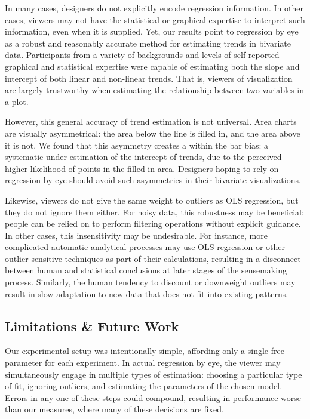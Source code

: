\documentclass{sigchi}
\begin{document}
In many cases, designers do not explicitly encode regression information. In other cases, viewers may not have the statistical or graphical expertise to interpret such information, even when it is supplied. Yet, our results point to regression by eye as a robust and reasonably accurate method for estimating trends in bivariate data. Participants from a variety of backgrounds and levels of self-reported graphical and statistical expertise were capable of estimating both the slope and intercept of both linear and non-linear trends. That is, viewers of visualization are largely trustworthy when estimating the relationship between two variables in a plot.

However, this general accuracy of trend estimation is not universal. Area charts are visually asymmetrical: the area below the line is filled in, and the area above it is not. We found that this asymmetry creates a within the bar bias: a systematic under-estimation of the intercept of trends, due to the perceived higher likelihood of points in the filled-in area. Designers hoping to rely on regression by eye should avoid such asymmetries in their bivariate visualizations.

Likewise, viewers do not give the same weight to outliers as OLS regression, but they do not ignore them either. For noisy data, this robustness may be beneficial: people can be relied on to perform filtering operations without explicit guidance. In other cases, this insensitivity may be undesirable. For instance, more complicated automatic analytical processes may use OLS regression or other outlier sensitive techniques as part of their calculations, resulting in a disconnect between human and statistical conclusions at later stages of the sensemaking process. Similarly, the human tendency to discount or downweight outliers may result in slow adaptation to new data that does not fit into existing patterns.

\subsection{Limitations \& Future Work}

Our experimental setup was intentionally simple, affording only a single free parameter for each experiment. In actual regression by eye, the viewer may simultaneously engage in multiple types of estimation: choosing a particular type of fit, ignoring outliers, and estimating the parameters of the chosen model. Errors in any one of these steps could compound, resulting in performance worse than our measures, where many of these decisions are fixed.
\end{document}
